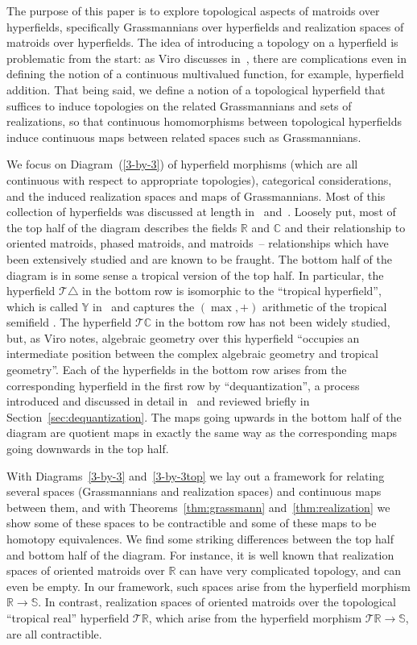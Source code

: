 \documentclass[10pt, preprint]{article}
\theoremstyle{definition}
\begin{document}
The purpose of this paper is to explore topological aspects of matroids
over hyperfields, specifically Grassmannians over hyperfields and
realization spaces of matroids over hyperfields. The idea of introducing
a topology on a hyperfield is problematic from the start: as Viro
discusses in~\cite{Viro}, there are complications even in defining
the notion of a continuous multivalued function, for example, hyperfield
addition. That being said, we define a notion of a topological
hyperfield that suffices to induce topologies on the related
Grassmannians and sets of realizations, so that continuous homomorphisms
between topological hyperfields induce continuous maps between related
spaces such as Grassmannians.

We focus on Diagram~(\ref{3-by-3}) of hyperfield morphisms (which are
all continuous with respect to appropriate topologies), categorical
considerations, and the induced realization spaces and maps of
Grassmannians. Most of this collection of hyperfields was discussed at
length in~\cite{Viro} and~\cite{Viro2}. Loosely put, most
of the top half of the diagram describes the fields $\mathbb{R}$ and
$\mathbb{C}$ and their relationship to oriented matroids, phased
matroids, and matroids~-- relationships which have been extensively
studied and are known to be fraught. The bottom half of the diagram is
in some sense a tropical version of the top half. In particular, the
hyperfield $\mathcal{T }\triangle $ in the bottom row is isomorphic to
the ``tropical hyperfield'', which is called $\mathbb{Y}$
in~\cite{Viro} and captures the $(\max , +)$ arithmetic of the
tropical semifield \cite{BS}. The hyperfield $\mathcal{T }
\mathbb{C}$ in the bottom row has not been widely studied, but, as Viro
\cite{Viro} notes, algebraic geometry over this hyperfield
``occupies an intermediate position between the complex algebraic
geometry and tropical geometry''. Each of the hyperfields in the bottom
row arises from the corresponding hyperfield in the first row by
``dequantization'', a process introduced and discussed in detail
in~\cite{Viro} and reviewed briefly in
Section~\ref{sec:dequantization}. The maps going upwards in the bottom
half of the diagram are quotient maps in exactly the same way as the
corresponding maps going downwards in the top half.

With Diagrams~\eqref{3-by-3} and~\eqref{3-by-3top} we lay out a
framework for relating several spaces (Grassmannians and realization
spaces) and continuous maps between them, and with
Theorems~\ref{thm:grassmann} and~\ref{thm:realization} we show some of
these spaces to be contractible and some of these maps to be homotopy
equivalences. We find some striking differences between the top half and
bottom half of the diagram. For instance, it is well known that
realization spaces of oriented matroids over $\mathbb{R}$ can have very
complicated topology, and can even be empty. In our framework, such
spaces arise from the hyperfield morphism $\mathbb{R}\to \mathbb{S}$.
In contrast, realization spaces of oriented matroids over the
topological ``tropical real'' hyperfield $\mathcal{T }\mathbb{R}$, which
arise from the hyperfield morphism $\mathcal{T }\mathbb{R}\to
\mathbb{S}$, are all contractible.
\end{document}
